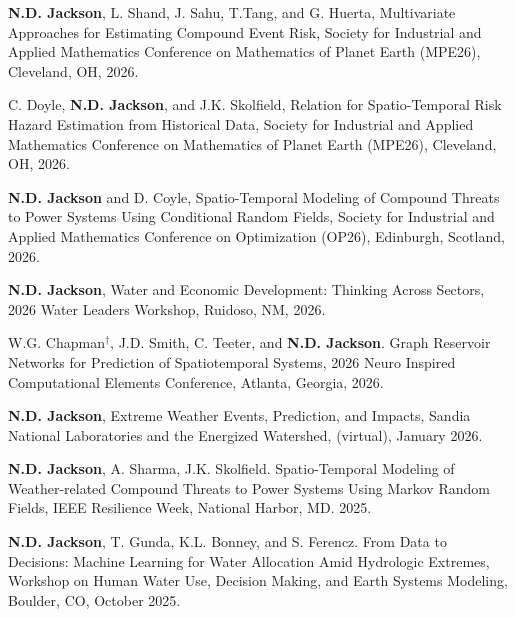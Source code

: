 \documentclass{article}[12pt]
\begin{document}
	\begin{etaremune}[]
		
		
		\item \textbf{N.D. Jackson}, L. Shand, J. Sahu, T.Tang, and G. Huerta, Multivariate Approaches for Estimating Compound Event Risk, Society for Industrial and Applied Mathematics Conference on Mathematics of Planet Earth (MPE26), Cleveland, OH, 2026. 
		
		\item C. Doyle, \textbf{N.D. Jackson}, and J.K. Skolfield, Relation for Spatio-Temporal Risk Hazard Estimation from Historical Data, Society for Industrial and Applied Mathematics Conference on Mathematics of Planet Earth (MPE26), Cleveland, OH, 2026. 
		
		\item \textbf{N.D. Jackson} and D. Coyle, Spatio-Temporal Modeling of Compound Threats to Power Systems Using Conditional Random Fields, Society for Industrial and Applied Mathematics Conference on Optimization (OP26), Edinburgh, Scotland, 2026. 
		
		\item \textbf{N.D. Jackson}, Water and Economic Development: Thinking Across Sectors, 2026 Water Leaders Workshop, Ruidoso, NM, 2026. 
		
		\item W.G. Chapman$^{\dagger}$, J.D. Smith, C. Teeter, and \textbf{N.D. Jackson}. Graph Reservoir Networks for Prediction of Spatiotemporal Systems, 2026 Neuro Inspired Computational Elements Conference, Atlanta, Georgia, 2026.
		
		\item \textbf{N.D. Jackson}, Extreme Weather Events, Prediction, and Impacts, Sandia National Laboratories and the Energized Watershed, (virtual), January 2026. 
		
		\item \textbf{N.D. Jackson}, A. Sharma, J.K. Skolfield. Spatio-Temporal Modeling of Weather-related Compound Threats to Power Systems Using Markov Random Fields, IEEE Resilience Week, National Harbor, MD. 2025. 
		
		\item \textbf{N.D. Jackson}, T. Gunda, K.L. Bonney, and S. Ferencz. From Data to Decisions: Machine Learning for Water Allocation Amid Hydrologic Extremes, Workshop on Human Water Use, Decision Making, and Earth Systems Modeling, Boulder, CO, October 2025. 
		

\end{etaremune}
\end{document}
